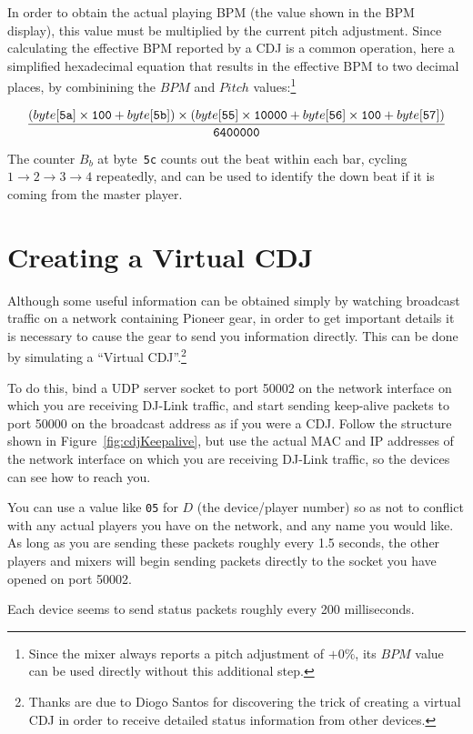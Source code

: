 \documentclass[11pt]{article}
\begin{document}
In order to obtain the actual playing BPM (the value shown in the BPM
display), this value must be multiplied by the current pitch
adjustment. Since calculating the effective BPM reported by a CDJ is a
common operation, here a simplified hexadecimal equation that results
in the effective BPM to two decimal places, by combinining the $BPM$
and $Pitch$ values:\footnote{Since the mixer always reports a pitch
  adjustment of $+0\%$, its $BPM$ value can be used directly without
  this additional step.}

\[ \frac{(byte[{\tt 5a}] \times {\tt 100} + byte[{\tt 5b}]) \times
  (byte[{\tt 55}] \times {\tt 10000} + byte[{\tt 56}] \times {\tt 100}
  + byte[{\tt 57}])} {\tt 6400000} \]

The counter $B_b$ at byte~{\tt 5c} counts out the beat within each
bar, cycling $1\to2\to3\to4$ repeatedly, and can be used to identify
the down beat if it is coming from the master player.

\section{Creating a Virtual CDJ}
\label{sec:virtualCdj}

Although some useful information can be obtained simply by watching
broadcast traffic on a network containing Pioneer gear, in order to
get important details it is necessary to cause the gear to send you
information directly. This can be done by simulating a ``Virtual
CDJ''.\footnote{Thanks are due to Diogo Santos for discovering the
  trick of creating a virtual CDJ in order to receive detailed status
  information from other devices.}

To do this, bind a UDP server socket to port 50002 on the network
interface on which you are receiving DJ-Link traffic, and start
sending keep-alive packets to port 50000 on the broadcast address as
if you were a CDJ. Follow the structure shown in
Figure~\ref{fig:cdjKeepalive}, but use the actual MAC and IP addresses
of the network interface on which you are receiving DJ-Link traffic,
so the devices can see how to reach you.

You can use a value like {\tt 05} for $D$ (the device/player number)
so as not to conflict with any actual players you have on the network,
and any name you would like. As long as you are sending these packets
roughly every 1.5 seconds, the other players and mixers will begin
sending packets directly to the socket you have opened on port 50002.

Each device seems to send status packets roughly every 200 milliseconds.
\end{document}
